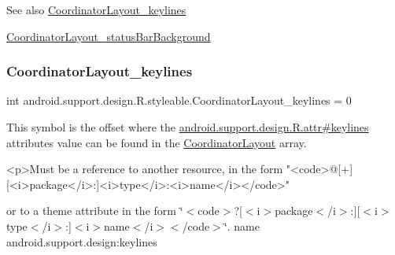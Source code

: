 \begin{DoxySeeAlso}{See also}
\hyperlink{classandroid_1_1support_1_1design_1_1R_1_1styleable_a61311d684777dd9d1ff2b1e62326b8ef}{Coordinator\+Layout\+\_\+keylines} 

\hyperlink{classandroid_1_1support_1_1design_1_1R_1_1styleable_ab58445af81b09a3c56a576412fa98b25}{Coordinator\+Layout\+\_\+status\+Bar\+Background} 
\end{DoxySeeAlso}
\mbox{\label{classandroid_1_1support_1_1design_1_1R_1_1styleable_a61311d684777dd9d1ff2b1e62326b8ef}} 
\subsubsection{\texorpdfstring{Coordinator\+Layout\+\_\+keylines}{CoordinatorLayout\_keylines}}
{\footnotesize\ttfamily int android.\+support.\+design.\+R.\+styleable.\+Coordinator\+Layout\+\_\+keylines = 0\hspace{0.3cm}{\ttfamily [static]}}

This symbol is the offset where the \hyperlink{classandroid_1_1support_1_1design_1_1R_1_1attr_ad44515d4a3d12b3ce358ed5901dd4590}{android.\+support.\+design.\+R.\+attr\#keylines} attribute\textquotesingle{}s value can be found in the \hyperlink{classandroid_1_1support_1_1design_1_1R_1_1styleable_aa61378a506fc889e9e7af20a32b5fa05}{Coordinator\+Layout} array.

\begin{DoxyVerb}      <p>Must be a reference to another resource, in the form "<code>@[+][<i>package</i>:]<i>type</i>:<i>name</i></code>"
\end{DoxyVerb}
 or to a theme attribute in the form \char`\"{}$<$code$>$?\mbox{[}$<$i$>$package$<$/i$>$\+:\mbox{]}\mbox{[}$<$i$>$type$<$/i$>$\+:\mbox{]}$<$i$>$name$<$/i$>$$<$/code$>$\char`\"{}.  name android.\+support.\+design\+:keylines \mbox{\label{classandroid_1_1support_1_1design_1_1R_1_1styleable_a8dd236b417b377b73830c1c47c3b2490}} 
